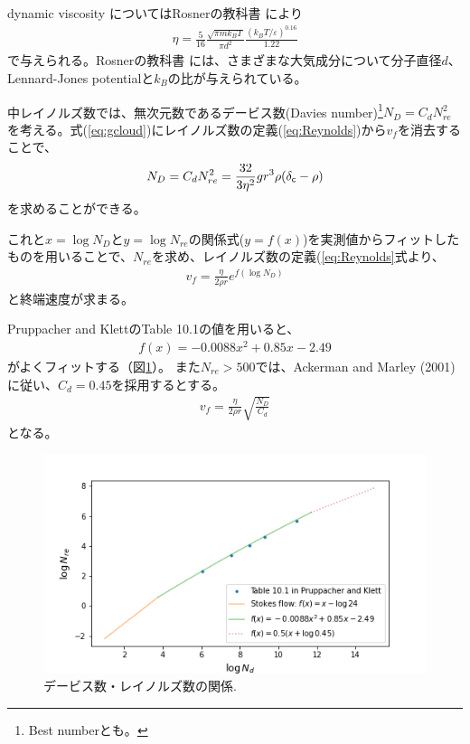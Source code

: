 dynamic viscosity についてはRosnerの教科書 \cite{rosner2012transport}により
\begin{align}
\label{eq:dyvis}
\eta = \frac{5}{16} \frac{\sqrt{\pi m k_B T}}{\pi d^2} \frac{(k_B T/\varepsilon)^{0.16}}{1.22}
\end{align}
で与えられる。Rosnerの教科書 \cite{rosner2012transport}には、さまざまな大気成分について分子直径$d$、Lennard-Jones potentialと$k_B$の比が与えられている。

中レイノルズ数では、無次元数であるデービス数(Davies number)\footnote{Best numberとも。}$N_D = C_d N_{re}^2 $を考える。式(\ref{eq:gcloud})にレイノルズ数の定義(\ref{eq:Reynolds})から$v_f$を消去することで、
\begin{align}
\label{eq:davies}
N_D = C_d N_{re}^2 = \frac{32}{3 \eta^2} g r^3 \rho (\delta_{\mathsf{c}} - \rho)
\end{align}
を求めることができる。

これと$x=\log{N_D}$と$y=\log{N_{re}}$の関係式($y=f(x)$)を実測値からフィットしたものを用いることで、$N_{re}$を求め、レイノルズ数の定義(\ref{eq:Reynolds}式より、
\begin{align}
\label{eq:vfmid}
v_f = \frac{\eta}{2 \rho r} e^{f(\log{N_D})}
\end{align}
と終端速度が求まる。

Pruppacher and Klett\cite{pruppacher2010microstructure}のTable 10.1の値を用いると、
\begin{align}
\label{eq:daviesn}
f(x) = -0.0088 x^2+0.85 x -2.49
\end{align}
がよくフィットする（図\ref{fig:davies}）。
また$N_{re}>500$では、Ackerman and Marley (2001) \cite{ackerman2001precipitating}に従い、$C_d=0.45$を採用するとする。
\begin{align}
\label{eq:vflarge}
v_f = \frac{\eta}{2 \rho r} \sqrt{\frac{N_D}{C_d}}
\end{align}
となる。

\begin{figure}[htb]
\begin{center}
\includegraphics[width=\linewidth]{fig/clouds/davies_reynolds.png}
\caption{デービス数・レイノルズ数の関係.\label{fig:davies}}
\end{center}
\end{figure}

